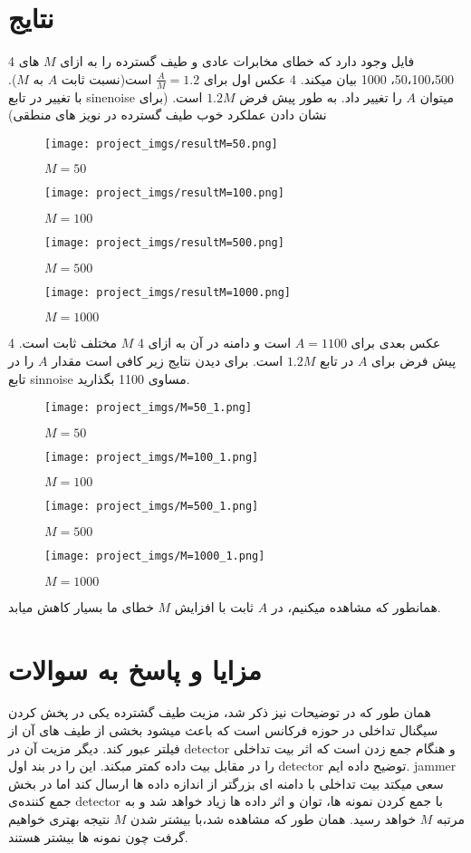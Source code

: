 \documentclass[11pt]{article}
\begin{document}
\begin{persian}
\section{نتایج}
4 فایل وجود دارد که خطای مخابرات عادی و طیف گسترده را به ازای $M$ های 50،100،500، 1000 بیان میکند.
4 عکس اول برای 
$\frac{A}{M}=1.2$
 است(نسبت ثابت $A$ به $M$). با تغییر در تابع sinenoise میتوان $A$ را تغییر داد.  به طور پیش فرض $1.2 M$ است. (برای نشان دادن عملکرد خوب طیف گسترده در نویز های منطقی)
\begin{figure}[H]
\centerline{\texttt{[image: project\_imgs/resultM=50.png]}}
\caption*{$M=50$}
\end{figure}
\begin{figure}[H]
\centerline{\texttt{[image: project\_imgs/resultM=100.png]}}
\caption*{$M=100$}
\end{figure}
\begin{figure}[H]
\centerline{\texttt{[image: project\_imgs/resultM=500.png]}}
\caption*{$M=500$}
\end{figure}
\begin{figure}[H]
\centerline{\texttt{[image: project\_imgs/resultM=1000.png]}}
\caption*{$M=1000$}
\end{figure}

4 عکس بعدی برای $A=1100$ است و دامنه در آن به ازای 4 $M$ مختلف ثابت است. پیش فرض برای $A$ در تابع $1.2M$ است. برای دیدن نتایج زیر کافی است مقدار $A$ را در تابع sinnoise
مساوی 1100 بگذارید.
\begin{figure}[H]
\centerline{\texttt{[image: project\_imgs/M=50\_1.png]}}
\caption*{$M=50$}
\end{figure}
\begin{figure}[H]
\centerline{\texttt{[image: project\_imgs/M=100\_1.png]}}
\caption*{$M=100$}
\end{figure}
\begin{figure}[H]
\centerline{\texttt{[image: project\_imgs/M=500\_1.png]}}
\caption*{$M=500$}
\end{figure}
\begin{figure}[H]
\centerline{\texttt{[image: project\_imgs/M=1000\_1.png]}}
\caption*{$M=1000$}
\end{figure}

همانطور که مشاهده میکنیم، در $A$ ثابت با افزایش $M$ خطای ما بسیار کاهش میابد.
\section{مزایا و پاسخ به سوالات}
همان طور که در توضیحات نیز ذکر شد، مزیت طیف گشترده یکی در پخش کردن سیگنال تداخلی در حوزه فرکانس است که باعث میشود بخشی از طیف های آن از فیلتر عبور کند. دیگر مزیت آن در detector و هنگام جمع زدن است که اثر بیت تداخلی را در مقابل بیت داده کمتر مبکند. این را در بند اول detector توضیح داده ایم. jammer سعی میکتد بیت تداخلی با دامنه ای بزرگتر از اندازه داده ها ارسال کند اما در بخش جمع کننده‌ی detector با جمع کردن نمونه ها، توان و اثر داده ها زیاد خواهد شد و به مرتبه $M$ خواهد رسید. همان طور که مشاهده شد،با بیشتر شدن $M$ نتیجه بهتری خواهیم گرفت چون نمونه ها بیشتر هستند.


\end{persian}
\end{document}

